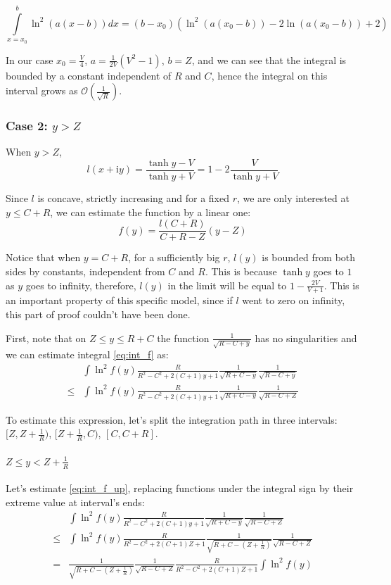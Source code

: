 \documentclass{gCOV2e}
\theoremstyle{plain}%
\theoremstyle{definition}
\theoremstyle{remark}
\begin{document}
\[
\int\limits_{x=x_0}^b \ln^2(a (x - b)) dx = (b - x_0) (\ln^2(a (x_0 - b)) - 2 \ln(a (x_0 - b)) + 2)
\]

In our case $x_0 = \frac{V}{4}$, $a = \frac{1}{2 V}(V^2 - 1)$, $b = Z$, and we can see that the integral is bounded by a constant independent of $R$ and $C$, hence the integral on this interval grows as $\mathcal{O}(\frac{1}{\sqrt{R}})$.

\subsubsection{Case 2: $y > Z$}
When $y > Z$, 
\[
l(x + \mathrm{i} y) 
 = \frac{\tanh y - V}{\tanh y + V}
 = 1 - 2 \frac{V}{\tanh y + V}
\]


Since $l$ is concave, strictly increasing and for a fixed $r$, we are only interested at $y \le C + R$, we can estimate the function by a linear one: 
\[
f(y) = \frac{l(C + R)}{C + R - Z} (y - Z)
\]

Notice that when $y = C + R$, for a sufficiently big $r$, $l(y)$ is bounded from both sides by constants, independent from $C$ and $R$. This is because $\tanh y$ goes to $1$ as $y$ goes to infinity, therefore, $l(y)$ in the limit will be equal to $1 - \frac{2 V}{V + 1}$. This is an important property of this specific model, since if $l$ went to zero on infinity, this part of proof couldn't have been done.

First, note that on $Z \le y \le R + C$ the function $\frac{1}{\sqrt{R - C + y}}$ has no singularities and we can estimate integral \ref{eq:int_f} as:
\begin{equation}\label{eq:int_f_up}
\begin{aligned}
       & \int \ln^2 f(y) \frac{R}{R^2 - C^2 + 2 (C + 1) y + 1} \frac{1}{\sqrt{R + C - y}} \frac{1}{\sqrt{R - C + y}}
\\ \le & \int \ln^2 f(y) \frac{R}{R^2 - C^2 + 2 (C + 1) y + 1} \frac{1}{\sqrt{R + C - y}} \frac{1}{\sqrt{R - C + Z}} 
\end{aligned}
\end{equation}

To estimate this expression, let's split the integration path in three intervals: $[Z, Z + \frac{1}{R})$, $[Z + \frac{1}{R}, C)$, $[C, C + R]$.

\paragraph{$Z \le y < Z + \frac{1}{R}$}

Let's estimate \ref{eq:int_f_up}, replacing functions under the integral sign by their extreme value at interval's ends:
\begin{align*}
       & \int \ln^2 f(y) \frac{R}{R^2 - C^2 + 2 (C + 1) y + 1} \frac{1}{\sqrt{R + C - y}} \frac{1}{\sqrt{R - C + Z}}
\\ \le & \int \ln^2 f(y) \frac{R}{R^2 - C^2 + 2 (C + 1) Z + 1} \frac{1}{\sqrt{R + C - (Z + \frac{1}{R})}} \frac{1}{\sqrt{R - C + Z}}
\\ =   & \frac{1}{\sqrt{R + C - (Z + \frac{1}{R})}} \frac{1}{\sqrt{R - C + Z}} \frac{R}{R^2 - C^2 + 2 (C + 1) Z + 1} \int \ln^2 f(y) 
\end{align*}
\end{document}

